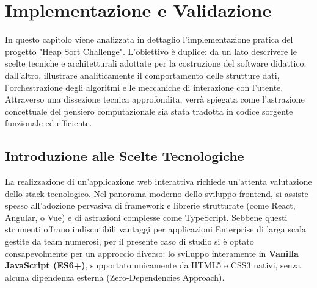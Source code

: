 \documentclass[openany]{theme/uniprthesis}
\begin{document}
\chapter{Implementazione e Validazione}
In questo capitolo viene analizzata in dettaglio l'implementazione pratica del progetto "Heap Sort Challenge". L'obiettivo è duplice: da un lato descrivere le scelte tecniche e architetturali adottate per la costruzione del software didattico; dall'altro, illustrare analiticamente il comportamento delle strutture dati, l'orchestrazione degli algoritmi e le meccaniche di interazione con l'utente. Attraverso una dissezione tecnica approfondita, verrà spiegata come l'astrazione concettuale del pensiero computazionale sia stata tradotta in codice sorgente funzionale ed efficiente.

\section{Introduzione alle Scelte Tecnologiche}
La realizzazione di un'applicazione web interattiva richiede un'attenta valutazione dello stack tecnologico. Nel panorama moderno dello sviluppo frontend, si assiste spesso all'adozione pervasiva di framework e librerie strutturate (come React, Angular, o Vue) e di astrazioni complesse come TypeScript. Sebbene questi strumenti offrano indiscutibili vantaggi per applicazioni Enterprise di larga scala gestite da team numerosi, per il presente caso di studio si è optato consapevolmente per un approccio diverso: lo sviluppo interamente in \textbf{Vanilla JavaScript (ES6+)}, supportato unicamente da HTML5 e CSS3 nativi, senza alcuna dipendenza esterna (Zero-Dependencies Approach).
\end{document}
